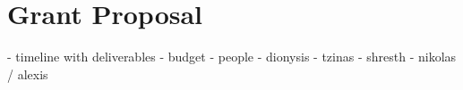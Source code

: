 \section{Grant Proposal}
- timeline with deliverables 
    - budget 
    - people 
        - dionysis
        - tzinas
        - shresth
        - nikolas / alexis
